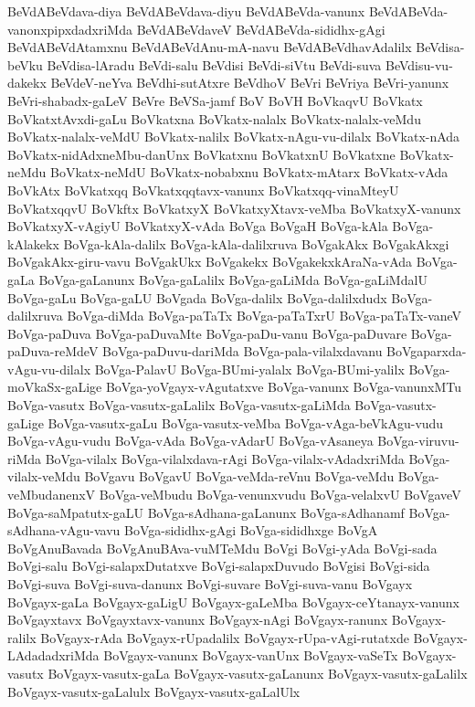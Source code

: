 {BeVdABeVdava-diya
BeVdABeVdava-diyu
BeVdABeVda-vanunx
BeVdABeVda-vanonxpipxdadxriMda
BeVdABeVdaveV
BeVdABeVda-sididhx-gAgi
BeVdABeVdAtamxnu
BeVdABeVdAnu-mA-navu
BeVdABeVdhavAdalilx
BeVdisa-beVku
BeVdisa-lAradu
BeVdi-salu
BeVdisi
BeVdi-siVtu
BeVdi-suva
BeVdisu-vu-dakekx
BeVdeV-neYva
BeVdhi-sutAtxre
BeVdhoV
BeVri
BeVriya
BeVri-yanunx
BeVri-shabadx-gaLeV
BeVre
BeVSa-jamf
BoV
BoVH
BoVkaqvU
BoVkatx
BoVkatxtAvxdi-gaLu
BoVkatxna
BoVkatx-nalalx
BoVkatx-nalalx-veMdu
BoVkatx-nalalx-veMdU
BoVkatx-nalilx
BoVkatx-nAgu-vu-dilalx
BoVkatx-nAda
BoVkatx-nidAdxneMbu-danUnx
BoVkatxnu
BoVkatxnU
BoVkatxne
BoVkatx-neMdu
BoVkatx-neMdU
BoVkatx-nobabxnu
BoVkatx-mAtarx
BoVkatx-vAda
BoVkAtx
BoVkatxqq
BoVkatxqqtavx-vanunx
BoVkatxqq-vinaMteyU
BoVkatxqqvU
BoVkftx
BoVkatxyX
BoVkatxyXtavx-veMba
BoVkatxyX-vanunx
BoVkatxyX-vAgiyU
BoVkatxyX-vAda
BoVga
BoVgaH
BoVga-kAla
BoVga-kAlakekx
BoVga-kAla-dalilx
BoVga-kAla-dalilxruva
BoVgakAkx
BoVgakAkxgi
BoVgakAkx-giru-vavu
BoVgakUkx
BoVgakekx
BoVgakekxkAraNa-vAda
BoVga-gaLa
BoVga-gaLanunx
BoVga-gaLalilx
BoVga-gaLiMda
BoVga-gaLiMdalU
BoVga-gaLu
BoVga-gaLU
BoVgada
BoVga-dalilx
BoVga-dalilxdudx
BoVga-dalilxruva
BoVga-diMda
BoVga-paTaTx
BoVga-paTaTxrU
BoVga-paTaTx-vaneV
BoVga-paDuva
BoVga-paDuvaMte
BoVga-paDu-vanu
BoVga-paDuvare
BoVga-paDuva-reMdeV
BoVga-paDuvu-dariMda
BoVga-pala-vilalxdavanu
BoVgaparxda-vAgu-vu-dilalx
BoVga-PalavU
BoVga-BUmi-yalalx
BoVga-BUmi-yalilx
BoVga-moVkaSx-gaLige
BoVga-yoVgayx-vAgutatxve
BoVga-vanunx
BoVga-vanunxMTu
BoVga-vasutx
BoVga-vasutx-gaLalilx
BoVga-vasutx-gaLiMda
BoVga-vasutx-gaLige
BoVga-vasutx-gaLu
BoVga-vasutx-veMba
BoVga-vAga-beVkAgu-vudu
BoVga-vAgu-vudu
BoVga-vAda
BoVga-vAdarU
BoVga-vAsaneya
BoVga-viruvu-riMda
BoVga-vilalx
BoVga-vilalxdava-rAgi
BoVga-vilalx-vAdadxriMda
BoVga-vilalx-veMdu
BoVgavu
BoVgavU
BoVga-veMda-reVnu
BoVga-veMdu
BoVga-veMbudanenxV
BoVga-veMbudu
BoVga-venunxvudu
BoVga-velalxvU
BoVgaveV
BoVga-saMpatutx-gaLU
BoVga-sAdhana-gaLanunx
BoVga-sAdhanamf
BoVga-sAdhana-vAgu-vavu
BoVga-sididhx-gAgi
BoVga-sididhxge
BoVgA
BoVgAnuBavada
BoVgAnuBAva-vuMTeMdu
BoVgi
BoVgi-yAda
BoVgi-sada
BoVgi-salu
BoVgi-salapxDutatxve
BoVgi-salapxDuvudo
BoVgisi
BoVgi-sida
BoVgi-suva
BoVgi-suva-danunx
BoVgi-suvare
BoVgi-suva-vanu
BoVgayx
BoVgayx-gaLa
BoVgayx-gaLigU
BoVgayx-gaLeMba
BoVgayx-ceYtanayx-vanunx
BoVgayxtavx
BoVgayxtavx-vanunx
BoVgayx-nAgi
BoVgayx-ranunx
BoVgayx-ralilx
BoVgayx-rAda
BoVgayx-rUpadalilx
BoVgayx-rUpa-vAgi-rutatxde
BoVgayx-LAdadadxriMda
BoVgayx-vanunx
BoVgayx-vanUnx
BoVgayx-vaSeTx
BoVgayx-vasutx
BoVgayx-vasutx-gaLa
BoVgayx-vasutx-gaLanunx
BoVgayx-vasutx-gaLalilx
BoVgayx-vasutx-gaLalulx
BoVgayx-vasutx-gaLalUlx
}
